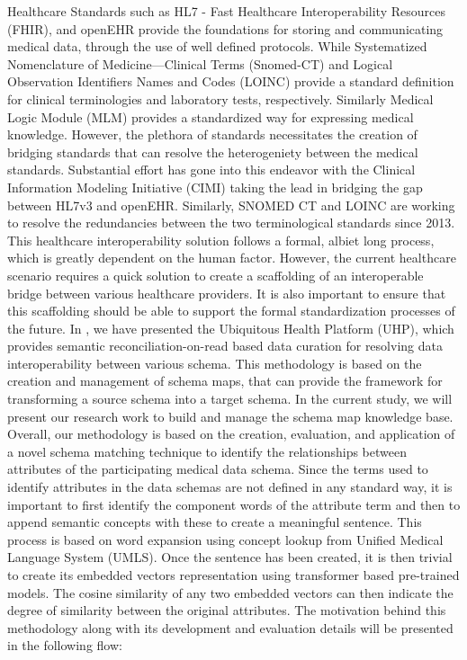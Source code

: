 \documentclass{ieeeaccess}
\begin{document}
Healthcare Standards such as HL7 - Fast Healthcare Interoperability Resources (FHIR), and openEHR provide the foundations for storing and communicating medical data, through the use of well defined protocols. While Systematized Nomenclature of Medicine—Clinical Terms (Snomed-CT) \cite{snomedct_url} and Logical Observation Identifiers Names and Codes (LOINC) \cite{loinc} provide a standard definition for clinical terminologies and laboratory tests, respectively. Similarly Medical Logic Module (MLM) provides a standardized way for expressing medical knowledge. However, the plethora of standards necessitates the creation of bridging standards that can resolve the heterogeniety between the medical standards. Substantial effort has gone into this endeavor with the Clinical Information Modeling Initiative (CIMI) \cite{CIMI2015} taking the lead in bridging the gap between HL7v3 and openEHR. Similarly, SNOMED CT and LOINC are working to resolve the redundancies between the two terminological standards since 2013. This healthcare interoperability solution follows a formal, albiet long process, which is greatly dependent on the human factor. However, the current healthcare scenario requires a quick solution to create a scaffolding of an interoperable bridge between various healthcare providers. It is also important to ensure that this scaffolding should be able to support the formal standardization processes of the future. In \cite{Satti2020}, we have presented the Ubiquitous Health Platform (UHP), which provides semantic reconciliation-on-read based data curation for resolving data interoperability between various schema. This methodology is based on the creation and management of schema maps, that can provide the framework for transforming a source schema into a target schema. 
In the current study, we will present our research work to build and manage the schema map knowledge base. Overall, our methodology is based on the creation, evaluation, and application of a novel schema matching technique to identify the relationships between attributes of the participating medical data schema. Since the terms used to identify attributes in the data schemas are not defined in any standard way, it is important to first identify the component words of the attribute term and then to append semantic concepts with these to create a meaningful sentence. This process is based on word expansion using concept lookup from Unified Medical Language System (UMLS). Once the sentence has been created, it is then trivial to create its embedded vectors representation using transformer based pre-trained models. The cosine similarity of any two embedded vectors can then indicate the degree of similarity between the original attributes. The motivation behind this methodology along with its development and evaluation details will be presented in the following flow:
\end{document}
